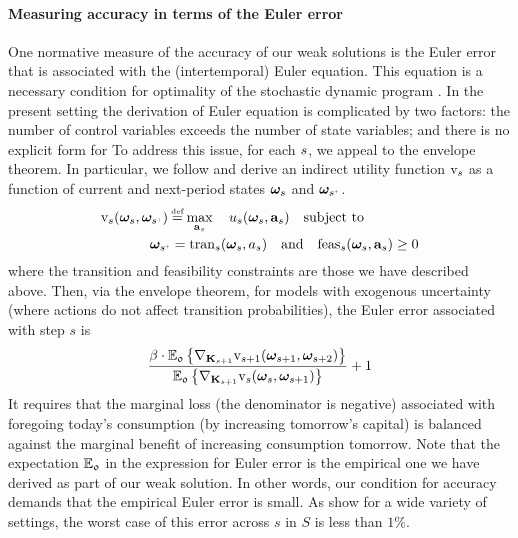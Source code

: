 \documentclass[12pt,a4paper,twoside, draft]{article}
\begin{document}
\paragraph{Measuring accuracy in terms of the Euler error}
One normative measure of the accuracy of our weak solutions is the Euler error
that is associated with the (intertemporal) Euler equation.
This equation is a necessary condition for optimality of the stochastic dynamic
program \citet{Stokey_Lucas-Recursive}.
In the present setting the derivation of Euler equation is complicated by two
factors: the number of control variables exceeds the number of state variables;
and there is no explicit form for
To address this issue, for each ${s}$, we appeal to the envelope theorem.
In particular, we follow \citet{Gonzalez_Hernandez-Euler}
and derive an indirect utility function
$\textup{v}_{{s}}$ as a function of current and next-period states $\boldsymbol{\omega}_{{s}}$
and $\boldsymbol{\omega}_{\node^{\mplus}}$.
\begin{align*}
   \textup{v}_{\node}(\boldsymbol{\omega}_{\node}, \boldsymbol{\omega}_{\node^{\mplus}}) \defeq
   \max_{\mathbf{a}_{\node}}  \quad {u}_{\node}(\boldsymbol{\omega}_{\node}, \mathbf{a}_{\node}) \quad &
     \textup{subject to}\\
   \quad \boldsymbol{\omega}_{\node^{\mplus}} = \textup{tran}_{\node}(\boldsymbol{\omega}_{\node}, a_{\node}) \quad
   \textup{and} & \quad \textup{feas}_{\node}(\boldsymbol{\omega}_{\node}, \mathbf{a}_{\node}) \geq 0
\end{align*}
where the transition and feasibility constraints are those we have described
above.
Then, via the envelope theorem, for models with exogenous uncertainty (where
actions do not affect transition probabilities), the Euler error associated
with step $s$ is
\begin{equation}
\frac{
  \beta \cdot \mathbb{E}_{\mathfrak{0}} \left\{
    \nabla_{\mathbf{K}_{s+1}} \textup{v}_{s+1}(\boldsymbol{\omega}_{s+1}, \boldsymbol{\omega}_{s+2})
  \right\}
  }{\mathbb{E}_{\mathfrak{0}} \left\{
    \nabla_{\mathbf{K}_{s+1}} \textup{v}_{s}(\boldsymbol{\omega}_{s}, \boldsymbol{\omega}_{s+1})
  \right\}
  } + 1
\end{equation}
It requires that the marginal loss (the denominator is negative) associated
with foregoing today's consumption (by increasing tomorrow's capital) is
balanced against the marginal benefit of increasing consumption tomorrow.
Note that the expectation $\mathbb E_{\mathfrak{0}}$ in the expression for
Euler error is the empirical one we have derived as part of our weak solution.
In other words, our condition for accuracy demands that the empirical Euler
error is small.
As \citet{CJ} show for a wide variety of settings, the worst case of this error
across $s$ in $S$ is less than $1\%$.
\end{document}
